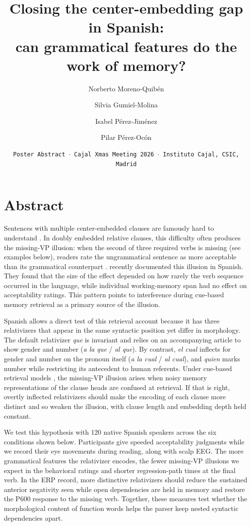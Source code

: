 \documentclass[12pt]{article}
\title{Closing the center-embedding gap in Spanish:\\can grammatical features do the work of memory?}
\author[1]{Norberto Moreno-Quibén}
\author[2]{Silvia Gumiel-Molina}
\author[3]{Isabel Pérez-Jiménez}
\author[4]{Pilar Pérez-Ocón}
\affil[1,2,3,4]{Departamento de Filología, Comunicación y Documentación, Universidad de Alcalá (UAH)}
\date{{\small {\tt Poster Abstract $\cdot$ Cajal Xmas Meeting 2026 $\cdot$ Instituto Cajal, CSIC, Madrid}}}
\newcommand{\es}[1]{\foreignlanguage{spanish}{\textit{#1}}}
\begin{document}
\maketitle

\section*{Abstract}

Sentences with multiple center-embedded clauses are famously hard to understand \parencite{Karlsson2007}. In doubly embedded relative clauses, this difficulty often produces the missing-VP illusion: when the second of three required verbs is missing (see examples below), readers rate the ungrammatical sentence as more acceptable than its grammatical counterpart \parencite{Lewis2005,Hahn2022}. \textcite{Paneda2024} recently documented this illusion in Spanish. They found that the size of the effect depended on how rarely the verb sequence occurred in the language, while individual working-memory span had no effect on acceptability ratings. This pattern points to interference during cue-based memory retrieval as a primary source of the illusion.

Spanish allows a direct test of this retrieval account because it has three relativizers that appear in the same syntactic position yet differ in morphology. The default relativizer \es{que} is invariant and relies on an accompanying article to show gender and number (\es{a la que} / \es{al que}). By contrast, \es{el cual} inflects for gender and number on the pronoun itself (\es{a la cual} / \es{al cual}), and \es{quien} marks number while restricting its antecedent to human referents. Under cue-based retrieval models \parencite{Lewis2005}, the missing-VP illusion arises when noisy memory representations of the clause heads are confused at retrieval. If that is right, overtly inflected relativizers should make the encoding of each clause more distinct and so weaken the illusion, with clause length and embedding depth held constant.

We test this hypothesis with 120 native Spanish speakers across the six conditions shown below. Participants give speeded acceptability judgments while we record their eye movements during reading, along with scalp EEG. The more grammatical features the relativizer encodes, the fewer missing-VP illusions we expect in the behavioral ratings and shorter regression-path times at the final verb. In the ERP record, more distinctive relativizers should reduce the sustained anterior negativity seen while open dependencies are held in memory and restore the P600 response to the missing verb. Together, these measures test whether the morphological content of function words helps the parser keep nested syntactic dependencies apart.
\end{document}
